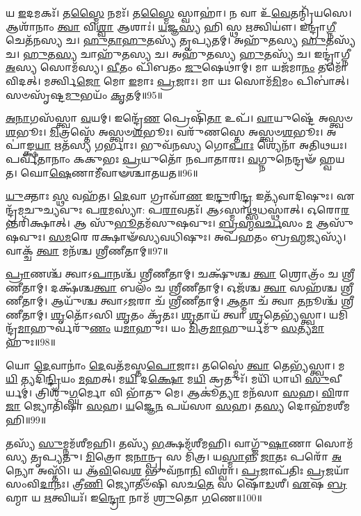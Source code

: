 𑌯 \ul{𑌇}\-𑌦𑌮𑌕𑌃᳴।
𑌤\-\ul{𑌸𑍍𑌮𑍈} 𑌨𑌮𑌃᳴।
𑌤\-\ul{𑌸𑍍𑌮𑍈} 𑌸𑍍𑌵𑌾𑌹𑌾॑।
𑌨 𑌵𑌾 𑌉᳴\-\ul{𑌵𑍇}\-𑌤𑌨𑍍𑌮𑍍𑌰𑌿᳴𑌯𑌸𑍇।
𑌆𑌶𑌾᳴𑌨𑌾𑌂 \ul{𑌤𑍍𑌵𑌾} 𑌵𑌿\-\ul{𑌶𑍍𑌵𑌾} 𑌆𑌶𑌾𑌃॑।
\-\ul{𑌯}\-𑌜𑍍𑌞\-\ul{𑌸𑍍𑌯} 𑌹𑌿 𑌸𑍍𑌥 \ul{𑌋}\-𑌤𑍍𑌵𑌿𑌯𑍗॑।
𑌇𑌨𑍍𑌦𑍍𑌰𑌾॑\-\ul{𑌗𑍍𑌨𑍀} 𑌚𑍇𑌤᳴𑌨𑌸𑍍𑌯 𑌚।
\-\ul{𑌹𑍁}\-\-\ul{𑌤𑌾}\-\-\ul{𑌹𑍁}\-𑌤𑌸𑍍𑌯᳴ 𑌤𑍃𑌪𑍍𑌯𑌤𑌮𑍍।
𑌅𑌹𑍁᳴𑌤𑌸𑍍𑌯 \ul{𑌹𑍁}\-𑌤𑌸𑍍𑌯᳴ 𑌚।
\-\ul{𑌹𑍁}\-𑌤\-\ul{𑌸𑍍𑌯} 𑌚𑌾𑌹𑍁᳴𑌤𑌸𑍍𑌯 𑌚।
𑌅𑌹𑍁᳴𑌤𑌸𑍍𑌯 \ul{𑌹𑍁}\-𑌤𑌸𑍍𑌯᳴ 𑌚।
𑌇𑌨𑍍𑌦𑍍𑌰𑌾॑𑌗𑍍𑌨𑍀 \ul{𑌅}\-𑌸𑍍𑌯 𑌸𑍋𑌮᳴𑌸𑍍𑌯।
\-\ul{𑌵𑍀}\-𑌤𑌂 𑌪𑌿᳴𑌬𑌤𑌂 \ul{𑌜𑍁}\-𑌷𑍇𑌥𑌾॑𑌮𑍍।
𑌮𑌾 𑌯𑌜᳴𑌮𑌾\-\ul{𑌨𑌂} 𑌤𑌮𑍋᳴ 𑌵𑌿𑌦𑌤𑍍।
𑌮𑌰𑍍𑌤𑍍𑌵𑌿\-\ul{𑌜𑍋} 𑌮𑍋 \ul{𑌇}\-𑌮𑌾𑌃 \ul{𑌪𑍍𑌰}\-𑌜𑌾𑌃।
𑌮𑌾 𑌯𑌃 𑌸𑍋𑌮᳴\-\ul{𑌮𑌿}\-𑌮𑌂 𑌪𑌿𑌬𑌾॑𑌤𑍍।
𑌸𑍞𑌸𑍃᳴𑌷𑍍𑌟\-\ul{𑌮𑍁}\-𑌭𑌯𑌂᳴ \ul{𑌕𑍃}\-𑌤𑌮𑍍॥95॥\anuvakamend[\-\ul{𑌕𑍃}\-\-\ul{𑌧𑌿} \ul{𑌮𑍀}\-𑌢𑍁𑌷𑍇\-𑌽𑌹𑍁᳴𑌤𑌸𑍍𑌯 𑌚 \ul{𑌸}\-𑌪𑍍𑌤 𑌚᳴]

\-\ul{𑌅}\-\-\ul{𑌨𑌾}\-𑌗𑌸᳴𑌸𑍍𑌤𑍍𑌵𑌾 \ul{𑌵}\-𑌯𑌮𑍍।
𑌇𑌨𑍍𑌦𑍍𑌰𑍇᳴\-\ul{𑌣} 𑌪𑍍𑌰𑍇𑌷𑌿᳴\-\ul{𑌤𑌾} 𑌉𑌪᳴।
\-\ul{𑌵𑌾}\-𑌯𑍁𑌷𑍍𑌟𑍇᳴ 𑌅𑌸𑍍𑌤𑍍𑌵𑍞\-\ul{𑌶}\-𑌭𑍂𑌃।
\-\ul{𑌮𑌿}\-𑌤𑍍𑌰𑌸𑍍𑌤𑍇᳴ 𑌅𑌸𑍍𑌤𑍍𑌵𑍞\-\ul{𑌶}\-𑌭𑍂𑌃।
𑌵𑌰𑍁᳴𑌣𑌸𑍍𑌤𑍇 𑌅𑌸𑍍𑌤𑍍𑌵𑍞\-\ul{𑌶}\-𑌭𑍂𑌃।
𑌅𑌪𑌾॑𑌙𑍍𑌕𑍍𑌷\-\ul{𑌯𑌾} 𑌋𑌤᳴𑌸𑍍𑌯 𑌗𑌰𑍍𑌭𑌾𑌃।
𑌭𑍁𑌵᳴𑌨𑌸𑍍𑌯 𑌗𑍋\-\ul{𑌪𑌾𑌃} 𑌶𑍍𑌯𑍇𑌨𑌾᳴ 𑌅𑌤𑌿𑌥𑌯𑌃।
𑌪𑌰𑍍𑌵᳴𑌤𑌾𑌨𑌾𑌂 𑌕𑌕𑍁𑌭𑌃 \ul{𑌪𑍍𑌰}\-𑌯𑍁𑌤𑍋᳴ 𑌨𑌪𑌾𑌤𑌾𑌰𑌃।
\-\ul{𑌵}\-𑌗𑍍𑌨𑍁𑌨𑍇𑌨𑍍𑌦𑍍𑌰𑍟᳴ 𑌹𑍍𑌵𑌯𑌤।
𑌘𑍋\-\ul{𑌷𑍇}\-𑌣𑌾𑌮𑍀᳴𑌵𑌾𑍟𑌶𑍍𑌚𑌾𑌤𑌯𑌤॥96॥

\-\ul{𑌯𑍁}\-𑌕𑍍𑌤𑌾𑌃 \ul{𑌸𑍍𑌥} 𑌵𑌹᳴𑌤।
\-\ul{𑌦𑍇}\-𑌵𑌾 𑌗𑍍𑌰𑌾𑌵𑌾᳴\-\ul{𑌣} 𑌇\-\ul{𑌨𑍍𑌦𑍁}\-𑌰𑌿\-\ul{𑌨𑍍𑌦𑍍𑌰} 𑌇𑌤𑍍𑌯᳴𑌵𑌾𑌦𑌿𑌷𑍁𑌃।
𑌏𑌨𑍍𑌦𑍍𑌰᳴𑌮𑌚𑍁𑌚𑍍𑌯𑌵𑍁𑌃 𑌪\-\ul{𑌰}\-𑌮𑌸𑍍𑌯𑌾॑: 𑌪\-\ul{𑌰𑌾}\-𑌵𑌤𑌃᳴।
𑌆𑌽𑌸𑍍𑌮𑌾\-\ul{𑌥𑍍𑌸}\-𑌧𑌸𑍍𑌥𑌾॑𑌤𑍍।
𑌓𑌰𑍋\-\ul{𑌰}\-𑌨𑍍𑌤𑌰𑌿᳴𑌕𑍍𑌷𑌾𑌤𑍍।
𑌆 𑌸𑍁᳴\-\ul{𑌭𑍂}\-𑌤𑌮᳴𑌸𑍁𑌷𑌵𑍁𑌃।
\-\ul{𑌬𑍍𑌰}\-\-\ul{𑌹𑍍𑌮}\-\-\ul{𑌵}\-\-\ul{𑌰𑍍𑌚}\-𑌸𑌂 \ul{𑌮} 𑌆𑌸𑍁᳴𑌷𑌵𑍁𑌃।
\-\ul{𑌸}\-\-\ul{𑌮}\-𑌰𑍇 𑌰𑌕𑍍𑌷𑌾𑍟᳴𑌸𑍍𑌯𑌵𑌧𑌿𑌷𑍁𑌃।
𑌅𑌪᳴𑌹𑌤𑌂 𑌬𑍍𑌰\-\ul{𑌹𑍍𑌮}\-𑌜𑍍𑌯𑌸𑍍𑌯᳴।
𑌵𑌾𑌕𑍍𑌚᳴ \ul{𑌤𑍍𑌵𑌾} 𑌮𑌨᳴𑌶𑍍𑌚 𑌶𑍍𑌰𑍀𑌣𑍀𑌤𑌾𑌮𑍍॥97॥

\-\ul{𑌪𑍍𑌰𑌾}\-𑌣𑌶𑍍𑌚᳴ 𑌤𑍍𑌵𑌾\-𑌽\-\ul{𑌪𑌾}\-𑌨𑌶𑍍𑌚᳴ 𑌶𑍍𑌰𑍀𑌣𑍀𑌤𑌾𑌮𑍍।
𑌚𑌕𑍍𑌷𑍁᳴𑌶𑍍𑌚 \ul{𑌤𑍍𑌵𑌾} 𑌶𑍍𑌰𑍋𑌤𑍍𑌰𑌂᳴ 𑌚 𑌶𑍍𑌰𑍀𑌣𑍀𑌤𑌾𑌮𑍍।
𑌦𑌕𑍍𑌷᳴𑌶𑍍𑌚\-\ul{𑌤𑍍𑌵𑌾} 𑌬𑌲𑌂᳴ 𑌚 𑌶𑍍𑌰𑍀𑌣𑍀𑌤𑌾𑌮𑍍।
𑌓𑌜᳴𑌶𑍍𑌚 \ul{𑌤𑍍𑌵𑌾} 𑌸𑌹᳴𑌶𑍍𑌚 𑌶𑍍𑌰𑍀𑌣𑍀𑌤𑌾𑌮𑍍।
𑌆𑌯𑍁᳴𑌶𑍍𑌚 𑌤𑍍𑌵𑌾\-𑌽\-\ul{𑌜}\-𑌰𑌾 𑌚᳴ 𑌶𑍍𑌰𑍀𑌣𑍀𑌤𑌾𑌮𑍍।
\-\ul{𑌆}\-𑌤𑍍𑌮𑌾 𑌚᳴ 𑌤𑍍𑌵𑌾 \ul{𑌤}\-𑌨𑍂𑌶𑍍𑌚᳴ 𑌶𑍍𑌰𑍀𑌣𑍀𑌤𑌾𑌮𑍍।
\-\ul{𑌶𑍃}\-𑌤𑍋᳴𑌽𑌸𑌿 \ul{𑌶𑍃}\-𑌤𑌂 𑌕𑍃᳴𑌤𑌃।
\-\ul{𑌶𑍃}\-𑌤𑌾𑌯᳴ 𑌤𑍍𑌵𑌾 \ul{𑌶𑍃}\-𑌤𑍇𑌭𑍍𑌯᳴𑌸𑍍𑌤𑍍𑌵𑌾।
𑌯𑌮𑌿𑌨𑍍𑌦𑍍𑌰᳴\-\ul{𑌮𑌾}\-𑌹𑍁𑌰𑍍𑌵𑌰𑍁᳴\-\ul{𑌣𑌂} 𑌯\-\ul{𑌮𑌾}\-𑌹𑍁𑌃।
𑌯𑌂 \ul{𑌮𑌿}\-𑌤𑍍𑌰\-\ul{𑌮𑌾}\-𑌹𑍁𑌰𑍍𑌯𑌮𑍁᳴ \ul{𑌸}\-𑌤𑍍𑌯\-\ul{𑌮𑌾}\-𑌹𑍁𑌃॥98॥

𑌯𑍋 \ul{𑌦𑍇}\-𑌵𑌾𑌨𑌾𑌂॑ \ul{𑌦𑍇}\-𑌵𑌤᳴𑌮𑌸𑍍𑌤\-\ul{𑌪𑍋}\-𑌜𑌾𑌃।
𑌤𑌸𑍍𑌮𑍈॑ \ul{𑌤𑍍𑌵𑌾} 𑌤𑍇𑌭𑍍𑌯᳴𑌸𑍍𑌤𑍍𑌵𑌾।
𑌮\-\ul{𑌯𑌿} 𑌤𑍍𑌯𑌦𑌿᳴\-\ul{𑌨𑍍𑌦𑍍𑌰𑌿}\-𑌯𑌂 \ul{𑌮}\-𑌹𑌤𑍍।
𑌮\-\ul{𑌯𑌿} 𑌦\-\ul{𑌕𑍍𑌷𑍋} 𑌮\-\ul{𑌯𑌿} 𑌕𑍍𑌰𑌤𑍁𑌃᳴।
𑌮𑌯𑌿᳴ 𑌧𑌾𑌯𑌿 \ul{𑌸𑍁}\-𑌵𑍀𑌰𑍍𑌯𑌮𑍍॑।
𑌤𑍍𑌰𑌿𑌶𑍁᳴\-\ul{𑌗𑍍𑌘}\-𑌰𑍍𑌮𑍋 𑌵𑌿 𑌭𑌾᳴𑌤𑍁 𑌮𑍇।
𑌆𑌕𑍂॑\-\ul{𑌤𑍍𑌯𑌾} 𑌮𑌨᳴𑌸𑌾 \ul{𑌸}\-𑌹।
\-\ul{𑌵𑌿}\-𑌰𑌾\-\ul{𑌜𑌾} 𑌜𑍍𑌯𑍋𑌤𑌿᳴𑌷𑌾 \ul{𑌸}\-𑌹।
\-\ul{𑌯}\-𑌜𑍍𑌞𑍇\-\ul{𑌨} 𑌪𑌯᳴𑌸𑌾 \ul{𑌸}\-𑌹।
𑌤\-\ul{𑌸𑍍𑌯} 𑌦𑍋𑌹᳴𑌮𑌶𑍀𑌮𑌹𑌿॥99॥

𑌤𑌸𑍍𑌯᳴ \ul{𑌸𑍁}\-𑌮𑍍𑌨𑌮᳴𑌶𑍀𑌮𑌹𑌿।
𑌤𑌸𑍍𑌯᳴ \ul{𑌭}\-𑌕𑍍𑌷𑌮᳴𑌶𑍀𑌮𑌹𑌿।
𑌵𑌾𑌗𑍍𑌜𑍁᳴\-\ul{𑌷𑌾}\-𑌣𑌾 𑌸𑍋𑌮᳴𑌸𑍍𑌯 𑌤𑍃𑌪𑍍𑌯𑌤𑍁।
\-\ul{𑌮𑌿}\-𑌤𑍍𑌰𑍋 𑌜\-\ul{𑌨𑌾}\-𑌨𑍍𑌪𑍍𑌰 𑌸 𑌮𑌿᳴𑌤𑍍𑌰।
𑌯\-\ul{𑌸𑍍𑌮𑌾}\-𑌨𑍍𑌨 \ul{𑌜𑌾}\-𑌤𑌃 𑌪𑌰𑍋᳴ \ul{𑌅}\-𑌨𑍍𑌯𑍋 𑌅𑌸𑍍𑌤𑌿᳴।
𑌯 𑌆᳴\-\ul{𑌵𑌿}\-𑌵𑍇\-\ul{𑌶} 𑌭𑍁𑌵᳴𑌨𑌾\-\ul{𑌨𑌿} 𑌵𑌿𑌶𑍍𑌵𑌾॑।
\-\ul{𑌪𑍍𑌰}\-𑌜𑌾\-𑌪᳴𑌤𑌿𑌃 \ul{𑌪𑍍𑌰}\-𑌜𑌯𑌾᳴ 𑌸𑌂𑌵𑌿\-\ul{𑌦𑌾}\-𑌨𑌃।
𑌤𑍍𑌰𑍀\-\ul{𑌣𑌿} 𑌜𑍍𑌯𑍋𑌤𑍀𑍞᳴𑌷𑌿 𑌸𑌚\-\ul{𑌤𑍇} 𑌸 𑌷𑍋᳴\-\ul{𑌡}\-𑌶𑍀।
\-\ul{𑌏}\-𑌷 \ul{𑌬𑍍𑌰}\-𑌹𑍍𑌮𑌾 𑌯 \ul{𑌋}\-𑌤𑍍𑌵𑌿𑌯𑌃᳴।
𑌇\-\ul{𑌨𑍍𑌦𑍍𑌰𑍋} 𑌨𑌾𑌮᳴ \ul{𑌶𑍍𑌰𑍁}\-𑌤𑍋 \ul{𑌗}\-𑌣𑍇॥100॥

